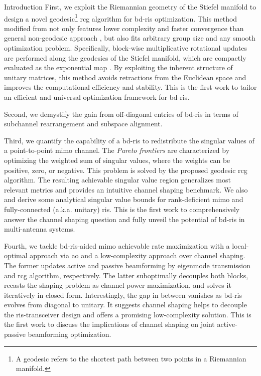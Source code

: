 \documentclass[journal]{IEEEtran}
\begin{document}
\begin{section}{Introduction}
	First, we exploit the Riemannian geometry of the Stiefel manifold to design a novel geodesic\footnote{A geodesic refers to the shortest path between two points in a Riemannian manifold.} \gls{rcg} algorithm for \gls{bd}-\gls{ris} optimization.
	This method modified from \cite{Abrudan2008,Abrudan2009} not only features lower complexity and faster convergence than general non-geodesic approach \cite{Absil2009,Pan2022d}, but also fits arbitrary group size and any smooth optimization problem.
	Specifically, block-wise multiplicative rotational updates are performed along the geodesics of the Stiefel manifold, which are compactly evaluated as the exponential map \cite{Edelman1998}.
	By exploiting the inherent structure of unitary matrices, this method avoids retractions from the Euclidean space and improves the computational efficiency and stability.
	This is the first work to tailor an efficient and universal optimization framework for \gls{bd}-\gls{ris}.


	Second, we demystify the gain from off-diagonal entries of \gls{bd}-\gls{ris} in terms of subchannel rearrangement and subspace alignment.


	Third, we quantify the capability of a \gls{bd}-\gls{ris} to redistribute the singular values of a point-to-point \gls{mimo} channel.
	The \emph{Pareto frontiers} are characterized by optimizing the {weighted sum of singular values}, where the weights can be positive, zero, or negative.
	This problem is solved by the proposed geodesic \gls{rcg} algorithm.
	The resulting achievable singular value region generalizes most relevant metrics and provides an intuitive channel shaping benchmark.
	We also and derive some analytical singular value bounds for rank-deficient \gls{mimo} and fully-connected (a.k.a. unitary) \gls{ris}.
	This is the first work to comprehensively answer the channel shaping question and fully unveil the potential of \gls{bd}-\gls{ris} in multi-antenna systems.

	Fourth, we tackle \gls{bd}-\gls{ris}-aided \gls{mimo} achievable rate maximization with a local-optimal approach via \gls{ao} and a low-complexity approach over channel shaping.
	The former updates active and passive beamforming by eigenmode transmission and \gls{rcg} algorithm, respectively.
	The latter suboptimally decouples both blocks, recasts the shaping problem as channel power maximization, and solves it iteratively in closed form.
	Interestingly, the gap in between vanishes as \gls{bd}-\gls{ris} evolves from diagonal to unitary.
	It suggests channel shaping helps to decouple the \gls{ris}-transceiver design and offers a promising low-complexity solution.
	This is the first work to discuss the implications of channel shaping on joint active-passive beamforming optimization.


\end{section}
\end{document}
